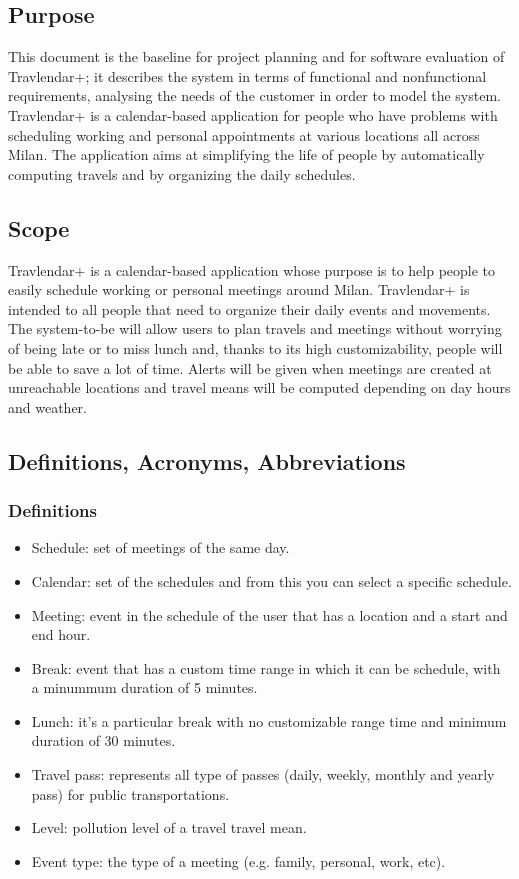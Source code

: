 \subsection{Purpose}
This document is the baseline for project planning and for software evaluation of Travlendar+; it describes the system in terms of functional and nonfunctional requirements, analysing the needs of the customer in order to model the system.\\
Travlendar+ is a calendar-based application for people who have problems with scheduling working and personal appointments at various locations all across Milan. The application aims at simplifying the life of people by automatically computing travels and by organizing the daily schedules.

\subsection{Scope}
Travlendar+ is a calendar-based application whose purpose is to help people to easily schedule working or personal meetings around Milan.
Travlendar+ is intended to all people that need to organize their daily events and movements. The system-to-be will allow users to plan travels and meetings without worrying of being late or to miss lunch and, thanks to its high customizability, people will be able to save a lot of time. Alerts will be given when meetings are created at unreachable locations and travel means will be computed depending on day hours and weather.

\subsection{Definitions, Acronyms, Abbreviations}

\subsubsection{Definitions}
\renewcommand{\labelitemi}{$-$}
\begin{itemize}
\item
Schedule: set of meetings of the same day.
\item
Calendar: set of the schedules and from this you can select a specific schedule.
\item
Meeting: event in the schedule of the user that has a location and a start and end hour.
\item
Break: event that has a custom time range in which it can be schedule, with a minummum duration of 5 minutes.
\item
Lunch: it's a particular break with no customizable range time and minimum duration of 30 minutes.
\item
Travel pass: represents all type of passes (daily, weekly, monthly and yearly pass) for public transportations.
\item
Level: pollution level of a travel travel mean. 
\item
Event type: the type of a meeting (e.g. family, personal, work, etc). 
\end{itemize}


